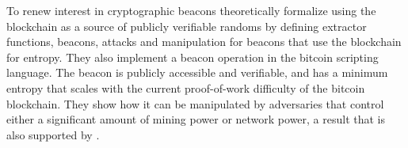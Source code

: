 To renew interest in cryptographic beacons \citet{bonneau2015bitcoin} theoretically formalize using the blockchain as a source of publicly verifiable randoms by defining extractor functions, beacons, attacks and manipulation for beacons that use the blockchain for entropy.
They also implement a beacon operation in the bitcoin scripting language.
The beacon is publicly accessible and verifiable, and has a minimum entropy that scales with the current proof-of-work difficulty of the bitcoin blockchain.
They show how it can be manipulated by adversaries that control either a significant amount of mining power or network power, a result that is also supported by \citet{pierrot2016malleability}.

